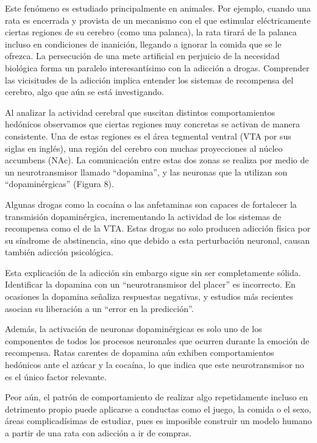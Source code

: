 Este fenómeno es estudiado principalmente en animales. Por ejemplo, cuando una rata es encerrada y provista de un mecanismo con el que estimular eléctricamente ciertas regiones de su cerebro (como una palanca), la rata tirará de la palanca incluso en condiciones de inanición, llegando a ignorar la comida que se le ofrezca. La persecución de una mete artificial en perjuicio de la necesidad biológica forma un paralelo interesantísimo con la adicción a drogas. Comprender las vicisitudes de la adicción implica entender los sistemas de recompensa del cerebro, algo que aún se está investigando.

Al analizar la actividad cerebral que suscitan distintos comportamientos hedónicos observamos que ciertas regiones muy concretas se activan de manera consistente. Una de estas regiones es el área tegmental ventral (VTA por sus siglas en inglés), una región del cerebro con muchas proyecciones al núcleo accumbens (NAc). La comunicación entre estas dos zonas se realiza por medio de un neurotransmisor llamado \enquote{dopamina}, y las neuronas que la utilizan son \enquote{dopaminérgicas} (Figura 8).

Algunas drogas como la cocaína o las anfetaminas son capaces de fortalecer la transmisión dopaminérgica, incrementando la actividad de los sistemas de recompensa como el de la VTA. Estas drogas no solo producen adicción física por su síndrome de abstinencia, sino que debido a esta perturbación neuronal, causan también adicción psicológica.


Esta explicación de la adicción sin embargo sigue sin ser completamente sólida. Identificar la dopamina con un \enquote{neurotransmisor del placer} es incorrecto. En ocasiones la dopamina señaliza respuestas negativas, y estudios más recientes asocian su liberación a un \enquote{error en la predicción}.

Además, la activación de neuronas dopaminérgicas es solo uno de los componentes de todos los procesos neuronales que ocurren durante la emoción de recompensa. Ratas carentes de dopamina aún exhiben comportamientos hedónicos ante el azúcar y la cocaína, lo que indica que este neurotransmisor no es el único factor relevante.

Peor aún, el patrón de comportamiento de realizar algo repetidamente incluso en detrimento propio puede aplicarse a conductas como el juego, la comida o el sexo, áreas complicadísimas de estudiar, pues es imposible construir un modelo humano a partir de una rata con adicción a ir de compras.

